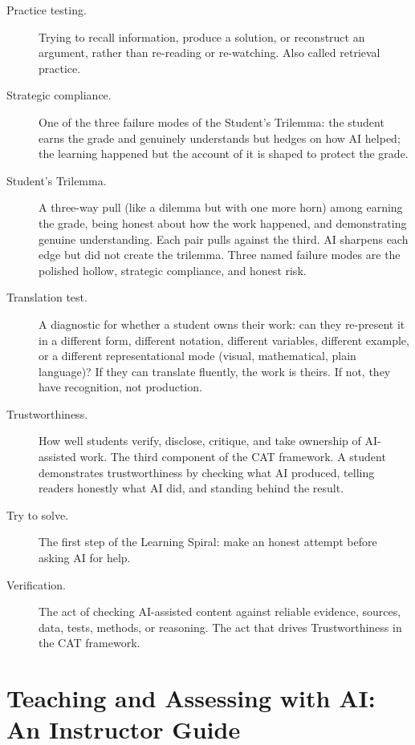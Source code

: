 \documentclass{SIAMbook2023}
\begin{document}
\begin{description}
\item[Practice testing.] Trying to recall information, produce a solution, or reconstruct an argument, rather than re-reading or re-watching. Also called retrieval practice.
\item[Strategic compliance.] One of the three failure modes of the Student's Trilemma: the student earns the grade and genuinely understands but hedges on how AI helped; the learning happened but the account of it is shaped to protect the grade.
\item[Student's Trilemma.] A three-way pull (like a dilemma but with one more horn) among earning the grade, being honest about how the work happened, and demonstrating genuine understanding. Each pair pulls against the third. AI sharpens each edge but did not create the trilemma. Three named failure modes are the polished hollow, strategic compliance, and honest risk.
\item[Translation test.] A diagnostic for whether a student owns their work: can they re-present it in a different form, different notation, different variables, different example, or a different representational mode (visual, mathematical, plain language)? If they can translate fluently, the work is theirs. If not, they have recognition, not production.
\item[Trustworthiness.] How well students verify, disclose, critique, and take ownership of AI-assisted work. The third component of the CAT framework. A student demonstrates trustworthiness by checking what AI produced, telling readers honestly what AI did, and standing behind the result.
\item[Try to solve.] The first step of the Learning Spiral: make an honest attempt before asking AI for help.
\item[Verification.] The act of checking AI-assisted content against reliable evidence, sources, data, tests, methods, or reasoning. The act that drives Trustworthiness in the CAT framework.
\end{description}


\part{Teaching and Assessing with AI: An Instructor Guide}
\label{part:instructor}
\end{document}
